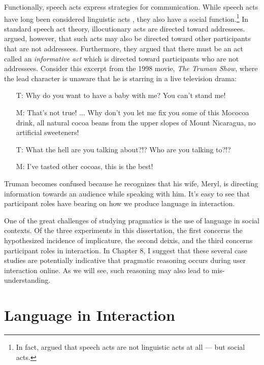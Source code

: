 Functionally, speech acts express strategies for communication. While speech acts have long been considered linguistic acts \cite[][and many others]{Searle:1969vw,Levinson:1983ww}, they also have a social function.\footnote{In fact, \cite{Geis:1995vo} argued that speech acts are not linguistic acts at all --- but social acts. } In standard speech act theory, illocutionary acts are directed toward addressees. \cite{Clark:1982tg} argued, however, that such acts may also be directed toward other participants that are not addressees. Furthermore, they argued that there must be an act called an \textit{informative act} which is directed toward participants who are not addressees. Consider this excerpt from the 1998 movie, \textit{The Truman Show}, where the lead character is unaware that he is starring in a live television drama:
\begin{itemize}
\item [T:] Why do you want to have a baby with me? You can't stand me!
\item [M:] That's not true! ... Why don't you let me fix you some of this Mococoa drink, all natural cocoa beans from the upper slopes of Mount Nicaragua, no artificial sweeteners!
\item [T:] What the hell are you talking about?!? Who are you talking to?!?
\item [M:] I've tasted other cocoas, this is the best!
\end{itemize}
Truman becomes confused because he recognizes that his wife, Meryl, is directing information towards an audience while speaking with him. It's easy to see that participant roles have bearing on how we produce language in interaction. 

One of the great challenges of studying pragmatics is the use of language in social contexts. Of the three experiments in this dissertation, the first concerns the hypothesized incidence of implicature, the second deixis, and the third concerns participant roles in interaction. In Chapter 8, I suggest that these several case studies are potentially indicative that pragmatic reasoning occurs during user interaction online. As we will see, such reasoning may also lead to mis-understanding.
 

\section{Language in Interaction}
\label{languageininteraction}

